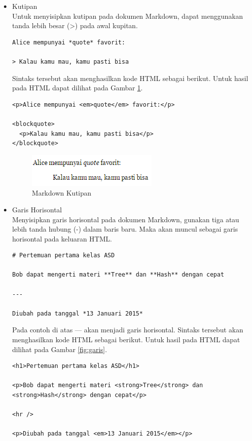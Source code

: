 \begin{itemize}
\item Kutipan\\
Untuk menyisipkan kutipan pada dokumen Markdown, dapat menggunakan tanda lebih besar (>) pada awal kupitan.
\begin{lstlisting}[basicstyle=\footnotesize]
Alice mempunyai *quote* favorit:

> Kalau kamu mau, kamu pasti bisa
\end{lstlisting}
Sintaks tersebut akan menghasilkan kode HTML sebagai berikut. Untuk
hasil pada HTML dapat dilihat pada Gambar \ref{fig:kutipan}.
\begin{lstlisting}[basicstyle=\footnotesize]
<p>Alice mempunyai <em>quote</em> favorit:</p>

<blockquote>
  <p>Kalau kamu mau, kamu pasti bisa</p>
</blockquote>
\end{lstlisting}
\begin{figure}[H]
\centering
\includegraphics[scale=1]{Gambar/kutipan.png}
\caption[Markdown Kutipan]{Markdown Kutipan}
\label{fig:kutipan}
\end{figure}

\item Garis Horisontal\\
Menyisipkan garis horisontal pada dokumen Markdown, gunakan tiga atau lebih tanda hubung (-) dalam baris baru. Maka akan muncul sebagai garis horisontal pada keluaran HTML.
\begin{lstlisting}[basicstyle=\footnotesize]
# Pertemuan pertama kelas ASD

Bob dapat mengerti materi **Tree** dan **Hash** dengan cepat

---

Diubah pada tanggal *13 Januari 2015*
\end{lstlisting}
Pada contoh di atas --- akan menjadi garis horisontal. Sintaks tersebut akan
menghasilkan kode HTML sebagai berikut. Untuk hasil pada HTML dapat dilihat pada
Gambar \ref{fig:garis}.
\begin{lstlisting}[basicstyle=\footnotesize]
<h1>Pertemuan pertama kelas ASD</h1>

<p>Bob dapat mengerti materi <strong>Tree</strong> dan <strong>Hash</strong> dengan cepat</p>

<hr />

<p>Diubah pada tanggal <em>13 Januari 2015</em></p>


\end{lstlisting}
\end{itemize}
